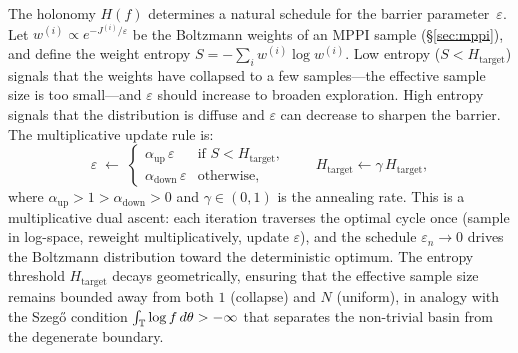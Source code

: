 \begin{remark}
\label{rmk:dual-ascent}
The holonomy $H(f)$ determines a natural schedule for the barrier
parameter~$\varepsilon$.
Let $w^{(i)} \propto e^{-J^{(i)}/\varepsilon}$ be the Boltzmann
weights of an MPPI sample (\S\ref{sec:mppi}), and define the
weight entropy $S = -\sum_i w^{(i)} \log w^{(i)}$.
Low entropy ($S < H_{\mathrm{target}}$) signals that the weights
have collapsed to a few samples---the effective sample size is too
small---and $\varepsilon$ should increase to broaden exploration.
High entropy signals that the distribution is diffuse and
$\varepsilon$ can decrease to sharpen the barrier.
The multiplicative update rule is:
\[
  \varepsilon \;\leftarrow\;
  \begin{cases}
    \alpha_{\mathrm{up}}\,\varepsilon
      & \text{if } S < H_{\mathrm{target}}, \\[2pt]
    \alpha_{\mathrm{down}}\,\varepsilon
      & \text{otherwise},
  \end{cases}
  \qquad
  H_{\mathrm{target}} \leftarrow \gamma\, H_{\mathrm{target}},
\]
where $\alpha_{\mathrm{up}} > 1 > \alpha_{\mathrm{down}} > 0$
and $\gamma \in (0,1)$ is the annealing rate.
This is a multiplicative dual ascent: each iteration traverses
the optimal cycle once (sample in log-space, reweight
multiplicatively, update $\varepsilon$), and the schedule
$\varepsilon_n \to 0$ drives the Boltzmann distribution toward
the deterministic optimum.
The entropy threshold $H_{\mathrm{target}}$ decays geometrically,
ensuring that the effective sample size remains bounded away
from both $1$ (collapse) and $N$ (uniform), in analogy with the
Szeg\H{o} condition
$\int_{\mathbb{T}} \log f\,d\theta > -\infty$
that separates the non-trivial basin from the degenerate boundary.
\end{remark}

